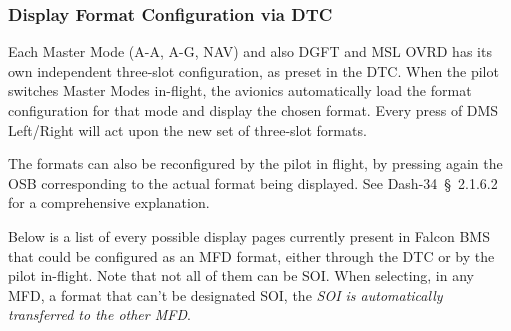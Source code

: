 \documentclass[11pt, a4paper, twoside]{report}
\providecommand{\dashref}[1]{Dash-34~\S~#1}
\begin{document}
\subsubsection{Display Format Configuration via DTC}
\label{sec:C4-S4-S2-S1}

Each Master Mode (A-A, A-G, NAV) and also DGFT and MSL OVRD has its own independent three-slot configuration, as preset in the DTC. When the pilot switches Master Modes in-flight, the avionics automatically load the format configuration for that mode and display the chosen format. Every press of DMS Left/Right will act upon the new set of three-slot formats.

The formats can also be reconfigured by the pilot in flight, by pressing again the OSB corresponding to the actual format being displayed. See \dashref{2.1.6.2} for a comprehensive explanation.

Below is a list of every possible display pages currently present in Falcon BMS that could be configured as an MFD format, either through the DTC or by the pilot in-flight. Note that not all of them can be SOI. When selecting, in any MFD, a format that can't be designated SOI, the \textit{SOI is automatically transferred to the other MFD}.

\small
\renewcommand{\arraystretch}{1.2}
\end{document}
